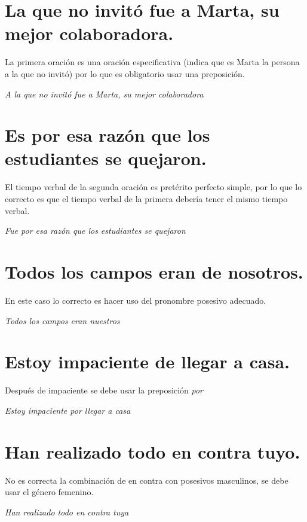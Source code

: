 \documentclass[12pt, a4paper, oneside]{report}
\begin{document}
        \section{\color{rojo}La que\color{negro} \;no invitó fue a Marta, su mejor colaboradora.}
        La primera oración es una oración especificativa (indica que es Marta la persona a la que no invitó)
        por lo que es obligatorio usar una preposición.
        \begin{center}
            \textit{\color{verde}A la que\color{negro} \;no invitó fue a Marta, su mejor colaboradora}
        \end{center}

        \section{\color{rojo}Es\color{negro} \;por esa razón que los estudiantes se quejaron.}
        El tiempo verbal de la segunda oración es pretérito perfecto simple, por lo que lo correcto es que el
        tiempo verbal de la primera debería tener el mismo tiempo verbal.
        \begin{center}
            \textit{\color{verde}Fue\color{negro} \;por esa razón que los estudiantes se quejaron}
        \end{center}

        \section{Todos los campos eran \color{rojo}de nosotros\color{negro}.}
        En este caso lo correcto es hacer uso del pronombre posesivo adecuado.
        \begin{center}
            \textit{Todos los campos eran \color{verde}nuestros\color{negro}}
        \end{center}
        \clearpage

        \section{Estoy impaciente \color{rojo}de\color{negro} \;llegar a casa.}
        Después de impaciente se debe usar la preposición \emph{por}
        \begin{center}
            \textit{Estoy impaciente \color{verde}por\color{negro} \;llegar a casa}
        \end{center}

        \section{Han realizado todo en contra \color{rojo}tuyo\color{negro}.}
        No es correcta la combinación de en contra con posesivos masculinos, se debe usar el género femenino.
        \begin{center}
            \textit{Han realizado todo en contra \color{verde}tuya\color{negro}}
        \end{center}
\end{document}

